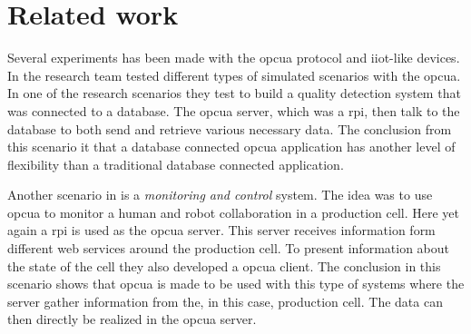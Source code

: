 \section{Related work} \label{relatedWork}
Several experiments has been made with the \acrshort{opcua} protocol and \acrshort{iiot}-like devices. In \cite{opcUaArt} the research team tested different types of simulated scenarios with the \acrshort{opcua}. In one of the research scenarios they test to build a quality detection system that was connected to a database. The \acrshort{opcua} server, which was a \acrfull{rpi}, then talk to the database to both send and retrieve various necessary data. The conclusion from this scenario it that a database connected \acrshort{opcua} application has another level of flexibility than a traditional database connected application.

Another scenario in \cite{opcUaArt} is a \textit{monitoring and control} system. The idea was to use \acrshort{opcua} to monitor a human and robot collaboration in a production cell. Here yet again a \acrshort{rpi} is used as the \acrshort{opcua} server. This server receives information form different web services around the production cell. To present information about the state of the cell they also developed a \acrshort{opcua} client.
The conclusion in this scenario shows that \acrshort{opcua} is made to be used with this type of systems where the server gather information from the, in this case, production cell. The data can then directly be realized in the \acrshort{opcua} server.